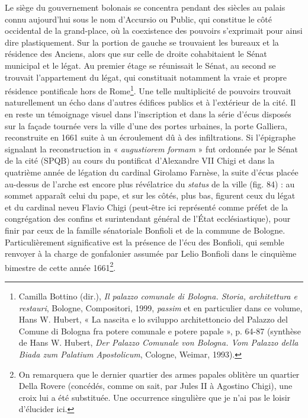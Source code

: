 \documentclass[12pt,twoside,openany]{book}
\begin{document}
Le siège du gouvernement bolonais se concentra pendant des siècles au palais connu aujourd’hui sous le nom d’Accursio ou Public, qui constitue le côté occidental de la grand-place, où la coexistence des pouvoirs s’exprimait pour ainsi dire plastiquement. Sur la portion de gauche se trouvaient les bureaux et la résidence des Anciens, alors que sur celle de droite cohabitaient le Sénat municipal et le légat. Au premier étage se réunissait le Sénat, au second se trouvait l’appartement du légat, qui constituait notamment la vraie et propre résidence pontificale hors de Rome\footnote{Camilla Bottino (dir.), \textit{Il palazzo comunale di Bologna. Storia, architettura e restauri}, Bologne, Compositori, 1999, \textit{passim} et en particulier dans ce volume, Hans W. Hubert, « La nascita e lo sviluppo architettoncio del Palazzo del Comune di Bologna fra potere comunale e potere papale », p. 64-87 (synthèse de Hans W. Hubert, \textit{Der Palazzo Comunale von Bologna. Vom Palazzo della Biada zum Palatium Apostolicum}, Cologne, Weimar, 1993).}. Une telle multiplicité de pouvoirs trouvait naturellement un écho dans d’autres édifices publics et à l’extérieur de la cité. Il en reste un témoignage visuel dans l’inscription et dans la série d’écus disposés sur la façade tournée vers la ville d’une des portes urbaines, la porte Galliera, reconstruite en 1661 suite à un écroulement dû à des infiltrations. Si l’épigraphe signalant la reconstruction in « \textit{augustiorem formam} » fut ordonnée par le Sénat de la cité (SPQB) au cours du pontificat d’Alexandre VII Chigi et dans la quatrième année de légation du cardinal Girolamo Farnèse, la suite d’écus placée au-dessus de l’arche est encore plus révélatrice du \textit{status} de la ville (fig. 84) : au sommet apparaît celui du pape, et sur les côtés, plus bas, figurent ceux du légat et du cardinal neveu Flavio Chigi (peut-être ici représenté comme préfet de la congrégation des confins et surintendant général de l’État ecclésiastique), pour finir par ceux de la famille sénatoriale Bonfioli et de la commune de Bologne. Particulièrement significative est la présence de l’écu des Bonfioli, qui semble renvoyer à la charge de gonfalonier assumée par Lelio Bonfioli dans le cinquième bimestre de cette année 1661\footnote{On remarquera que le dernier quartier des armes papales oblitère un quartier Della Rovere (concédés, comme on sait, par Jules II à Agostino Chigi), une croix lui a été substituée. Une occurrence singulière que je n’ai pas le loisir d’élucider ici.}.
\end{document}
